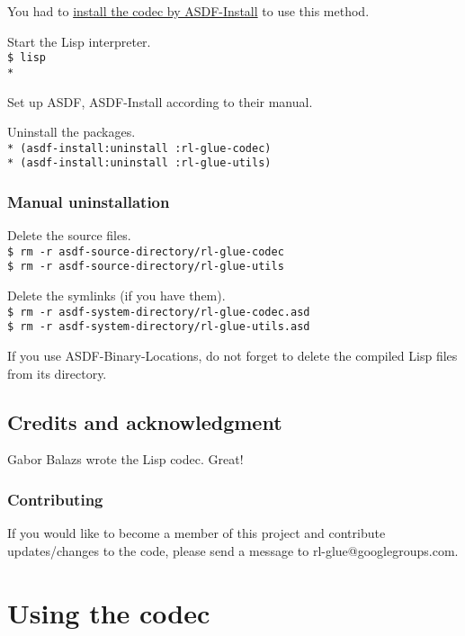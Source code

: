 \documentclass[11pt,a4paper,dvipdfm]{article}
\newcommand{\prompttext}[1]{\texttt{#1}}
\newcommand{\shprompt}[1]{\prompttext{\$ #1}}
\newcommand{\lispprompt}[1]{\prompttext{* #1}}
\begin{document}
You had to \hyperlink{asdfinst}{install the codec by ASDF-Install} to use this
method.

Start the Lisp interpreter. \\
\shprompt{lisp} \\
\lispprompt{}

Set up ASDF, ASDF-Install according to their manual.

Uninstall the packages. \\
\lispprompt{(asdf-install:uninstall :rl-glue-codec)} \\
\lispprompt{(asdf-install:uninstall :rl-glue-utils)}

\subsubsection{Manual uninstallation}

Delete the source files. \\
\shprompt{rm -r asdf-source-directory/rl-glue-codec} \\
\shprompt{rm -r asdf-source-directory/rl-glue-utils}

Delete the symlinks (if you have them). \\
\shprompt{rm -r asdf-system-directory/rl-glue-codec.asd} \\
\shprompt{rm -r asdf-system-directory/rl-glue-utils.asd}

If you use ASDF-Binary-Locations, do not forget to delete the compiled
Lisp files from its directory.

\subsection{Credits and acknowledgment}

Gabor Balazs wrote the Lisp codec. Great!

\subsubsection{Contributing}

If you would like to become a member of this project and contribute 
updates/changes to the code, please send a message to rl-glue@googlegroups.com.


\section{Using the codec}
\end{document}
